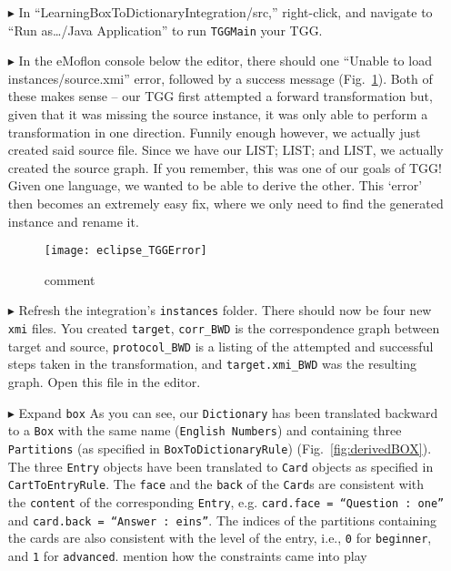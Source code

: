 \begin{itemize}
\item[$\blacktriangleright$] In ``LearningBox\-To\-Dictionary\-In\-te\-gra\-tion\-/src,'' right-click, and navigate to ``Run as\ldots/Java Application'' to run
\texttt{TGGMain} your TGG.

\item[$\blacktriangleright$] In the eMoflon console below the editor, there should  one ``Unable to load instances/source.xmi'' error, followed by a success
message (Fig.~\ref{fig:tggERROR}). Both of these makes sense -- our TGG first attempted a forward transformation but, given that it was missing the source instance,
it was only able to perform a transformation in one direction. Funnily enough however, we actually just created said source file. Since we have our LIST; LIST; and LIST, we
actually created the source graph. If you remember, this was one of our goals of TGG! Given one language, we wanted to be able to derive the other.  This
`error' then becomes an extremely easy fix, where we only need to find the generated instance and rename it.

\begin{figure}[htbp]
\begin{center}
  \texttt{[image: eclipse\_TGGError]}
  \caption{comment}
  \label{fig:tggERROR}
\end{center}
\end{figure}

\newpage

\item[$\blacktriangleright$] Refresh the integration's \texttt{instances} folder. There should now be four new \texttt{xmi} files. You created \texttt{target},
\texttt{corr\_BWD} is the correspondence graph between target and source, \texttt{protocol\_BWD} is a listing of the attempted and successful steps taken in the
transformation, and \texttt{target.xmi\_BWD} was the resulting graph. Open this file in the editor.

\item[$\blacktriangleright$] Expand \texttt{box} As you can see, our \texttt{Dictionary} has been translated backward to a \texttt{Box} with the same name
(\texttt{English Numbers}) and containing three \texttt{Par\-ti\-tions} (as specified in \texttt{Box\-To\-Dictionary\-Rule}) (Fig.~\ref{fig:derivedBOX}). The three
\texttt{Entry} objects have been translated to \texttt{Card} objects as specified in \texttt{CartToEntryRule}. The \texttt{face} and the \texttt{back} of the \texttt{Card}s are consistent with the \texttt{content}
of the corresponding \texttt{Entry}, e.g. \texttt{card.face = ``Question : one''} and \texttt{card.back = ``Answer : eins''}. The indices of the partitions
containing the cards are also consistent with the level of the entry, i.e., \texttt{0} for \texttt{beginner}, and \texttt{1} for \texttt{advanced}. \update
mention how the constraints came into play


\end{itemize}
